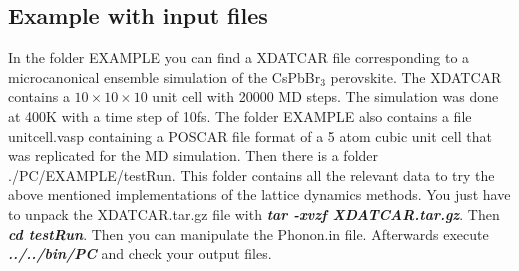 \documentclass[a4paper,12pt]{article}
\begin{document}
\subsection{Example with input files}
In the folder EXAMPLE you can find a XDATCAR file corresponding to a microcanonical ensemble simulation
of the CsPbBr$_{3}$ perovskite. The XDATCAR contains a $10\times10\times10$ unit cell with 20000 MD steps.
The simulation was done at 400K with a time step of 10fs. The folder EXAMPLE also
contains a file unitcell.vasp containing a POSCAR file format of a 5 atom cubic unit cell
that was replicated for the MD simulation. Then there is a folder ./PC/EXAMPLE/testRun.
This folder contains all the relevant data to try the above mentioned implementations of the
lattice dynamics methods. You just have to unpack the XDATCAR.tar.gz file with 
\textbf{\textit{tar -xvzf XDATCAR.tar.gz}}. Then \textbf{\textit{cd testRun}}.
Then you can manipulate the Phonon.in file. Afterwards execute \textbf{\textit{../../bin/PC}}
and check your output files.
\end{document}
